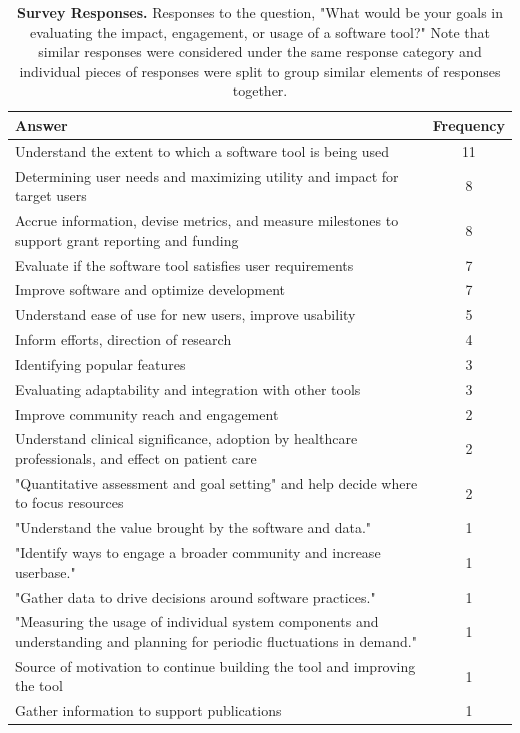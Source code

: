 \documentclass{article}
\begin{document}
\begin{table}[!ht]
 \caption{\textbf{Survey Responses.} Responses to the question, "What would be your goals in evaluating the impact, engagement, or usage of a software tool?" Note that similar responses were considered under the same response category and individual pieces of responses were split to group similar elements of responses together.}
  \centering
  \begin{tabular}{|p{}|c|}
    \hline
    \rowcolor[gray]{.9} \textbf{Answer} & \textbf{Frequency} \\
    \hline
    Understand the extent to which a software tool is being used & 11 \\
    \hline
    Determining user needs and maximizing utility and impact for target users & 8 \\
    \hline
    Accrue information, devise metrics, and measure milestones to support grant reporting and funding & 8 \\
    \hline
    Evaluate if the software tool satisfies user requirements & 7 \\
    \hline
    Improve software and optimize development & 7 \\
    \hline
    Understand ease of use for new users, improve usability & 5 \\
    \hline
    Inform efforts, direction of research & 4 \\
    \hline
    Identifying popular features & 3 \\
    \hline
    Evaluating adaptability and integration with other tools & 3 \\
    \hline
    Improve community reach and engagement & 2 \\
    \hline
    Understand clinical significance, adoption by healthcare professionals, and effect on patient care & 2 \\
    \hline
    "Quantitative assessment and goal setting" and help decide where to focus resources & 2 \\
    \hline
    "Understand the value brought by the software and data." & 1 \\
    \hline
    "Identify ways to engage a broader community and increase userbase." & 1 \\
    \hline
    "Gather data to drive decisions around software practices." & 1 \\
    \hline
    "Measuring the usage of individual system components and understanding and planning for periodic fluctuations in demand." & 1 \\
    \hline
    Source of motivation to continue building the tool and improving the tool & 1 \\
    \hline
    Gather information to support publications & 1 \\
    \hline
  \end{tabular}
  \label{tab:survey_table}
\end{table}
\end{document}
